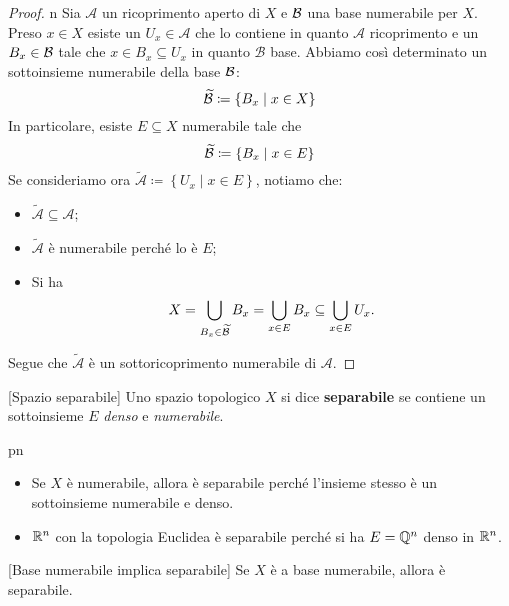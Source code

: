 \begin{proof}{n}
Sia $\mathcal{A}$ un ricoprimento aperto di $X$ e $\mathcal{B}$ una base numerabile per $X$. Preso $x\in X$ esiste un $U_x\in\mathcal{A}$ che lo contiene in quanto $\mathcal{A}$ ricoprimento e un $B_x\in\mathcal{B}$ tale che $x\in B_x\subseteq U_x$ in quanto $\mathcal{B}$ base. Abbiamo così determinato un sottoinsieme numerabile della base $\mathcal{B}$:
\begin{equation*}
\widetilde{\mathcal{B}}\coloneqq\left\{B_x\mid x\in X\right\}
\end{equation*}
In particolare, esiste $E\subseteq X$ numerabile tale che
\begin{equation*}
\widetilde{\mathcal{B}}\coloneqq\left\{B_x\mid x\in E\right\}
\end{equation*}
Se consideriamo ora $\widetilde{\mathcal{A}}\coloneqq\left\{U_x\mid x\in E\right\}$, notiamo che:
\begin{itemize}
	\item $\widetilde{\mathcal{A}}\subseteq \mathcal{A}$;
	\item $\widetilde{\mathcal{A}}$ è numerabile perché lo è $E$;
	\item Si ha
	\begin{equation*}
		X=\bigcup_{B_x\in\widetilde{\mathcal{B}}}B_x=\bigcup_{x\in E}B_x\subseteq \bigcup_{x\in E}U_x.
	\end{equation*}
\end{itemize}
Segue che $\widetilde{\mathcal{A}}$ è un sottoricoprimento numerabile di $\mathcal{A}$.\qedhere
\end{proof}
\begin{definition}{}[Spazio separabile]
Uno spazio topologico $X$ si dice \textbf{separabile} se contiene un sottoinsieme $E$ \textit{denso} e \textit{numerabile}.
\end{definition}
\begin{example}{pn}~{}
	\begin{itemize}
		\item Se $X$ è numerabile, allora è separabile perché l'insieme stesso è un sottoinsieme numerabile e denso.
		\item $\mathbb{R}^n$ con la topologia Euclidea è separabile perché si ha $E=\mathbb{Q}^n$ denso in $\mathbb{R}^n$.
	\end{itemize}
\end{example}
\begin{lemma}{}[Base numerabile implica separabile]\label{basenumseparabile}
Se $X$ è a base numerabile, allora è separabile.
\end{lemma}
